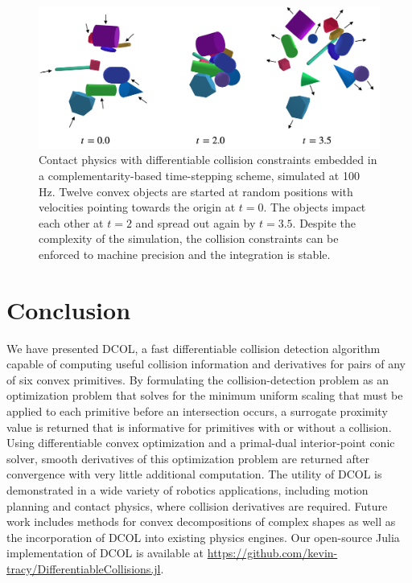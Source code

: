 \begin{figure}[t]
\centerline{\includegraphics[width = .9\columnwidth]{figures/mashup.png}}
\caption{Contact physics with differentiable collision constraints embedded in a complementarity-based time-stepping scheme, simulated at 100 Hz.  Twelve convex objects are started at random positions with velocities pointing towards the origin at $t=0$. The objects impact each other at $t=2$ and spread out again by $t=3.5$.  Despite the complexity of the simulation, the collision constraints can be enforced to machine precision and the integration is stable.}
\label{fig:mashup}
\vspace{-10pt}
\end{figure}
\section{Conclusion}\label{sec:dcol:conclusion}
We have presented DCOL, a fast differentiable collision detection algorithm capable of computing useful collision information and derivatives for pairs of any of six convex primitives. By formulating the collision-detection problem as an optimization problem that solves for the minimum uniform scaling that must be applied to each primitive before an intersection occurs, a surrogate proximity value is returned that is informative for primitives with or without a collision. Using differentiable convex optimization and a primal-dual interior-point conic solver, smooth derivatives of this optimization problem are returned after convergence with very little additional computation. The utility of DCOL is demonstrated in a wide variety of robotics applications, including motion planning and contact physics, where collision derivatives are required. Future work includes methods for convex decompositions of complex shapes as well as the incorporation of DCOL into existing physics engines. Our open-source Julia implementation of DCOL is available at \url{https://github.com/kevin-tracy/DifferentiableCollisions.jl}. 




